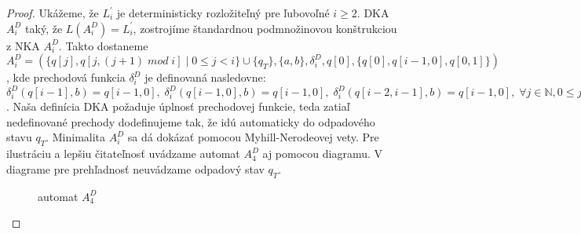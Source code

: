 \begin{proof}
\par
Ukážeme, že $ L^{\prime}_i $ je deterministicky rozložiteľný pre ľubovoľné $ i \geq 2 $. DKA $ A_i^D $ taký, že $ L(A_i^D)=L^{\prime}_i $, zostrojíme štandardnou podmnožinovou konštrukciou z NKA $ A_i^D $. Takto dostaneme $ A_i^D = (\lbrace q[j],q[j,(j+1) \; mod \; i] \; | \; 0 \leq j < i \rbrace \cup \lbrace q_T \rbrace,\lbrace a,b \rbrace, \delta_i^D, q[0], \lbrace q[0], q[i-1,0],q[0,1] \rbrace) $, kde prechodová funkcia $ \delta_i^D $ je definovaná nasledovne: $ \delta_i^D(q[i-1],b) = q[i-1,0], \; \delta_i^D(q[i-1,0],b) = q[i-1,0], \; \delta_i^D(q[i-2,i-1],b) = q[i-1,0] , \; \forall j \in \mathbb{N}, 0 \leq j < i : \delta_i^D(q[j],a) = q[(j+1) \; mod \; i], \delta_i^D(q[j,(j+1) \; mod \; i],a) = q[(j+1) \; mod \; i, (((j+1) \; mod \; i)+1)  \; mod \; i] $. Naša definícia DKA požaduje úplnosť prechodovej funkcie, teda zatiaľ nedefinované prechody dodefinujeme tak, že idú automaticky do odpadového stavu $ q_T $. Minimalita $ A_i^D $ sa dá dokázať pomocou Myhill-Nerodeovej vety. Pre ilustráciu a lepšiu čitateľnosť uvádzame automat $ A_4^D $ aj pomocou diagramu. V diagrame pre prehľadnosť neuvádzame odpadový stav $ q_T $.

\begin{figure}[H]
\centering
{}
\caption{automat $ A_4^D $}
\end{figure}


\end{proof}
